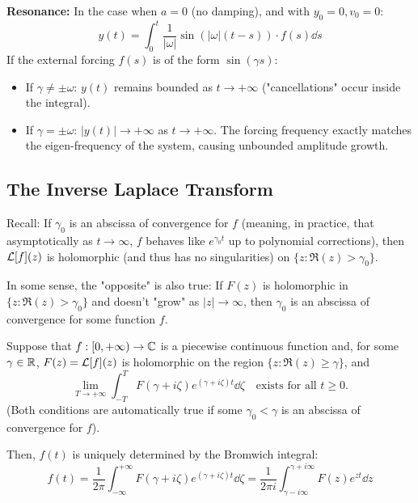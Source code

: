 \textbf{Resonance:} In the case when $a=0$ (no damping), and with $y_0 = 0, v_0 = 0$:
\[
y(t) = \int_{0}^{t} \frac{1}{|\omega|} \sin(|\omega|(t-s)) \cdot f(s)\dd s
\]
If the external forcing $f(s)$ is of the form $\sin(\gamma s)$:
\begin{itemize}
    \item If $\gamma \neq \pm \omega$: $y(t)$ remains bounded as $t \to +\infty$ ("cancellations" occur inside the integral).
    \item If $\gamma = \pm \omega$: $|y(t)| \to +\infty$ as $t \to +\infty$. The forcing frequency exactly matches the eigen-frequency of the system, causing unbounded amplitude growth.
\end{itemize}

\newpage

\subsection{The Inverse Laplace Transform}

Recall: If $\gamma_0$ is an abscissa of convergence for $f$ (meaning, in practice, that asymptotically as $t \to \infty$, $f$ behaves like $e^{\gamma_0 t}$ up to polynomial corrections), then $\mathcal{L}[f](z)$ is holomorphic (and thus has no singularities) on $\{z : \Re(z) > \gamma_0\}$.

In some sense, the "opposite" is also true: If $F(z)$ is holomorphic in $\{z : \Re(z) > \gamma_0\}$ and doesn't "grow" as $|z| \to \infty$, then $\gamma_0$ is an abscissa of convergence for some function $f$.

\begin{theorem}
Suppose that $f: [0, +\infty) \to \mathbb{C}$ is a piecewise continuous function and, for some $\gamma \in \mathbb{R}$, $F(z) = \mathcal{L}[f](z)$ is holomorphic on the region $\{z : \Re(z) \ge \gamma\}$, and
\[
\lim_{T \to +\infty} \int_{-T}^{T} F(\gamma + i\zeta) e^{(\gamma + i\zeta)t} \dd \zeta \quad \text{exists for all } t \ge 0.
\]
(Both conditions are automatically true if some $\gamma_0 < \gamma$ is an abscissa of convergence for $f$).

\begin{center}
\end{center}

Then, $f(t)$ is uniquely determined by the Bromwich integral:
\[
f(t) = \frac{1}{2\pi} \int_{-\infty}^{+\infty} F(\gamma + i\zeta) e^{(\gamma + i\zeta)t} \dd\zeta = \frac{1}{2\pi i} \int_{\gamma - i\infty}^{\gamma + i\infty} F(z) e^{zt} \dd z
\]
\end{theorem}


